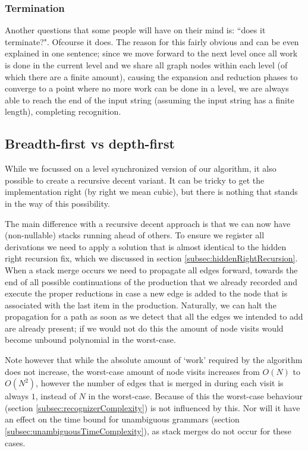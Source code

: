 \documentclass[a4paper,10pt]{article}
\begin{document}
\subsubsection{Termination}
Another questions that some people will have on their mind is: ``does it terminate?". Ofcourse it does. The reason for this fairly obvious and can be even explained in one sentence; since we move forward to the next level once all work is done in the current level and we share all graph nodes within each level (of which there are a finite amount), causing the expansion and reduction phases to converge to a point where no more work can be done in a level, we are always able to reach the end of the input string (assuming the input string has a finite length), completing recognition.

\subsection{Breadth-first vs depth-first}
\label{sec:breadthFirstVsDepthFirst}

While we focussed on a level synchronized version of our algorithm, it also possible to create a recursive decent variant. It can be tricky to get the implementation right (by right we mean cubic), but there is nothing that stands in the way of this possibility.

The main difference with a recursive decent approach is that we can now have (non-nullable) stacks running ahead of others. To ensure we register all derivations we need to apply a solution that is almost identical to the hidden right recursion fix, which we discussed in section \ref{subsec:hiddenRightRecursion}. When a stack merge occurs we need to propagate all edges forward, towards the end of all possible continuations of the production that we already recorded and execute the proper reductions in case a new edge is added to the node that is associated with the last item in the production. Naturally, we can halt the propagation for a path as soon as we detect that all the edges we intended to add are already present; if we would not do this the amount of node visits would become unbound polynomial in the worst-case.

Note however that while the absolute amount of `work' required by the algorithm does not increase, the worst-case amount of node visits increases from $O(N)$ to $O(N^2)$, however the number of edges that is merged in during each visit is always $1$, instead of $N$ in the worst-case. Because of this the worst-case behaviour (section \ref{subsec:recognizerComplexity}) is not influenced by this. Nor will it have an effect on the time bound for unambiguous grammars (section \ref{subsec:unambiguousTimeComplexity}), as stack merges do not occur for these cases.
\end{document}
